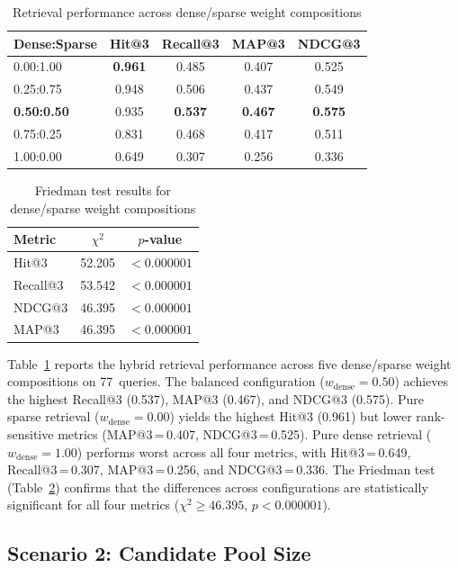 \documentclass[conference]{IEEEtran}
\begin{document}
\begin{table}[H]
\centering
\caption{Retrieval performance across dense/sparse weight compositions}
\label{tab:hybrid}
\small
\begin{tabular}{lcccc}
\toprule
Dense:Sparse & Hit@3 & Recall@3 & MAP@3 & NDCG@3 \\
\midrule
0.00:1.00 & \textbf{0.961} & 0.485 & 0.407 & 0.525 \\
0.25:0.75 & 0.948 & 0.506 & 0.437 & 0.549 \\
\textbf{0.50:0.50} & 0.935 & \textbf{0.537} & \textbf{0.467} & \textbf{0.575} \\
0.75:0.25 & 0.831 & 0.468 & 0.417 & 0.511 \\
1.00:0.00 & 0.649 & 0.307 & 0.256 & 0.336 \\
\bottomrule
\end{tabular}
\end{table}

\begin{table}[H]
\centering
\caption{Friedman test results for dense/sparse weight compositions}
\label{tab:hybrid_friedman}
\small
\begin{tabular}{lcc}
\toprule
Metric & $\chi^2$ & $p$-value \\
\midrule
Hit@3    & 52.205 & $< 0.000001$ \\
Recall@3 & 53.542 & $< 0.000001$ \\
NDCG@3   & 46.395 & $< 0.000001$ \\
MAP@3    & 46.395 & $< 0.000001$ \\
\bottomrule
\end{tabular}
\end{table}

Table~\ref{tab:hybrid} reports the hybrid retrieval performance across
five dense/sparse weight compositions on 77~queries. The balanced
configuration ($w_{\text{dense}}=0.50$) achieves the highest Recall@3
(0.537), MAP@3 (0.467), and NDCG@3 (0.575). Pure sparse retrieval
($w_{\text{dense}}=0.00$) yields the highest Hit@3 (0.961) but lower
rank-sensitive metrics (MAP@3\,=\,0.407, NDCG@3\,=\,0.525). Pure dense
retrieval ($w_{\text{dense}}=1.00$) performs worst across all four
metrics, with Hit@3\,=\,0.649, Recall@3\,=\,0.307, MAP@3\,=\,0.256,
and NDCG@3\,=\,0.336. The Friedman test
(Table~\ref{tab:hybrid_friedman}) confirms that the differences across
configurations are statistically significant for all four metrics
($\chi^2 \geq 46.395$, $p < 0.000001$).

\subsection{Scenario 2: Candidate Pool Size}
\end{document}
